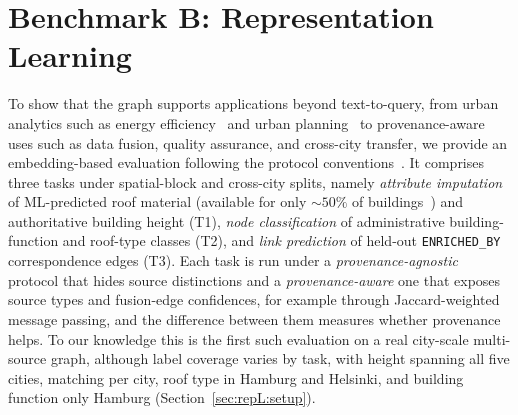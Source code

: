 \documentclass[sigconf,authordraft]{acmart}
\begin{document}


\section{Benchmark B: Representation Learning}\label{subsec:rl_tasks}

To show that the graph supports applications beyond text-to-query, from urban analytics such as energy efficiency~\citep{Yap2025} and urban planning~\citep{LIU2022102936} to provenance-aware uses such as data fusion, quality assurance, and cross-city transfer, we provide an embedding-based evaluation following the protocol conventions~\citep{dwivedi_benchmarkgnn_2023}. It comprises three tasks under spatial-block and cross-city splits, namely \emph{attribute imputation} of ML-predicted roof material (available for only ${\sim}\num{50}\%$ of buildings~\citep{lukas_roofmaterials}) and authoritative building height (T1), \emph{node classification} of administrative building-function and roof-type classes (T2), and \emph{link prediction} of held-out \texttt{ENRICHED\_BY} correspondence edges (T3). Each task is run under a \emph{provenance-agnostic} protocol that hides source distinctions and a \emph{provenance-aware} one that exposes source types and fusion-edge confidences, for example through Jaccard-weighted message passing, and the difference between them measures whether provenance helps. To our knowledge this is the first such evaluation on a real city-scale multi-source graph, although label coverage varies by task, with height spanning all five cities, matching per city, roof type in Hamburg and Helsinki, and building function only Hamburg (Section~\ref{sec:repL:setup}).
\end{document}
